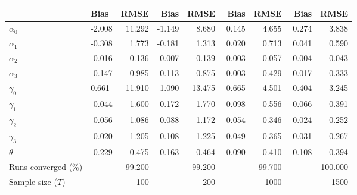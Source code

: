 
\begin{tabular}[t]{llrrrrrrr}
\toprule
  & Bias & RMSE & Bias & RMSE & Bias & RMSE & Bias & RMSE\\
\midrule
$\alpha_{0}$ & -2.008 & 11.292 & -1.149 & 8.680 & 0.145 & 4.655 & 0.274 & 3.838\\
$\alpha_{1}$ & -0.308 & 1.773 & -0.181 & 1.313 & 0.020 & 0.713 & 0.041 & 0.590\\
$\alpha_{2}$ & -0.016 & 0.136 & -0.007 & 0.139 & 0.003 & 0.057 & 0.004 & 0.043\\
$\alpha_{3}$ & -0.147 & 0.985 & -0.113 & 0.875 & -0.003 & 0.429 & 0.017 & 0.333\\
$\gamma_{0}$ & 0.661 & 11.910 & -1.090 & 13.475 & -0.665 & 4.501 & -0.404 & 3.245\\
$\gamma_{1}$ & -0.044 & 1.600 & 0.172 & 1.770 & 0.098 & 0.556 & 0.066 & 0.391\\
$\gamma_{2}$ & -0.056 & 1.086 & 0.088 & 1.172 & 0.054 & 0.346 & 0.024 & 0.252\\
$\gamma_{3}$ & -0.020 & 1.205 & 0.108 & 1.225 & 0.049 & 0.365 & 0.031 & 0.267\\
$\theta$ & -0.229 & 0.475 & -0.163 & 0.464 & -0.090 & 0.410 & -0.108 & 0.394\\
Runs converged (\%) &  & 99.200 &  & 99.200 &  & 99.700 &  & 100.000\\
Sample size ($T$) &  & 100 &  & 200 &  & 1000 &  & 1500\\
\bottomrule
\end{tabular}
